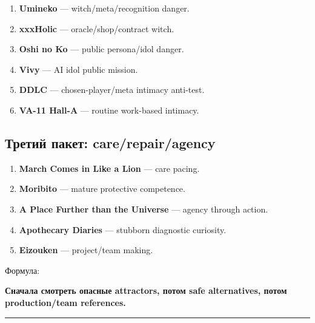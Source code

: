 \begin{enumerate}
\def\labelenumi{\arabic{enumi}.}
\setcounter{enumi}{7}
\tightlist
\item
  \textbf{Umineko} --- witch/\hspace{0pt}meta/\hspace{0pt}recognition danger.
\item
  \textbf{xxxHolic} --- oracle/\hspace{0pt}shop/\hspace{0pt}contract witch.
\item
  \textbf{Oshi no Ko} --- public persona/\hspace{0pt}idol danger.
\item
  \textbf{Vivy} --- AI idol public mission.
\item
  \textbf{DDLC} --- chosen-player/\hspace{0pt}meta intimacy anti-test.
\item
  \textbf{VA-11 Hall-A} --- routine work-based intimacy.
\end{enumerate}

\subsection*{Третий пакет: care/\hspace{0pt}repair/\hspace{0pt}agency}

\begin{enumerate}
\def\labelenumi{\arabic{enumi}.}
\setcounter{enumi}{13}
\tightlist
\item
  \textbf{March Comes in Like a Lion} --- care pacing.
\item
  \textbf{Moribito} --- mature protective competence.
\item
  \textbf{A Place Further than the Universe} --- agency through action.
\item
  \textbf{Apothecary Diaries} --- stubborn diagnostic curiosity.
\item
  \textbf{Eizouken} --- project/\hspace{0pt}team making.
\end{enumerate}

Формула:

\textbf{Сначала смотреть опасные attractors, потом safe alternatives,
потом production/\hspace{0pt}team references.}

\begin{center}\rule{0.5\linewidth}{0.5pt}\end{center}


